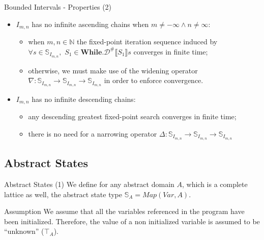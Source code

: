 \begin{frame}{Bounded Intervals - Properties (2)}
    \begin{itemize}
        \item $I_{m,n}$ has no infinite ascending chains when $m \neq -\infty \land n \neq \infty$:
        \begin{itemize}
            \item when $m,n\in \mathbb{N}$ the fixed-point iteration sequence induced by $\forall s \in \mathbb{S}_{I_{m,n}},\,\,S_1 \in \textbf{While}$.$\mathcal{D}^{\#}\llbracket S_1 \rrbracket s$ converges in finite time;
            \item otherwise, we must make use of the widening operator $\nabla: \mathbb{S}_{I_{m,n}} \to \mathbb{S}_{I_{m,n}} \to\mathbb{S}_{I_{m,n}}$ in order to enforce convergence. 
        \end{itemize}
        \item $I_{m,n}$ has no infinite descending chains:
        \begin{itemize}
            \item any descending greatest fixed-point search converges in finite time;
            \item there is no need for a narrowing operator $\Delta: \mathbb{S}_{I_{m,n}} \to \mathbb{S}_{I_{m,n}} \to\mathbb{S}_{I_{m,n}}$
        \end{itemize}
    \end{itemize}
    
\end{frame}

\subsection{Abstract States}

\begin{frame}{Abstract States (1)}
    We define for any abstract domain $A$, which is a complete lattice as well, the abstract state type $\mathbb{S}_A = Map(Var, A)$.
    
    \begin{alertblock}{Assumption}
        We assume that all the variables referenced in the program have been initialized. Therefore, the value of a non initialized variable is assumed to be ``unknown'' ($\top_A$). 
    \end{alertblock}
\end{frame}

